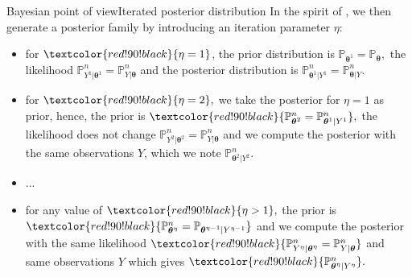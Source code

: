 \documentclass[10pt]{beamer}
\begin{document}
\begin{frame}{Bayesian point of view}{Iterated posterior distribution}
In the spirit of \citet{OBJJ}, we then generate a posterior family by introducing an \textcolor{red!90!black}{iteration parameter $\eta$}:
\begin{itemize}
\item<1-> for $\textcolor{red!90!black}{\eta = 1}$, the prior distribution is $\mathbb{P}_{\boldsymbol{\theta}^{1}} = \mathbb{P}_{\boldsymbol{\theta}},$ the likelihood $\mathbb{P}_{Y^{1} \vert \boldsymbol{\theta}^{1}}^{n} = \mathbb{P}_{Y \vert \boldsymbol{\theta}}^{n}$ and the posterior distribution is $\mathbb{P}_{\boldsymbol{\theta}^{1} \vert Y^{1}}^{n} = \mathbb{P}_{\boldsymbol{\theta}\vert Y}^{n}.$
\item<2-> for $\textcolor{red!90!black}{\eta = 2},$ we take the posterior for $\eta = 1$ as prior, hence, the \textcolor{red!90!black}{prior is} $\textcolor{red!90!black}{\mathbb{P}_{\boldsymbol{\theta}^{2}}^{n} = \mathbb{P}_{\boldsymbol{\theta}^{1} \vert Y^{1}}^{n}},$ the likelihood does not change $\mathbb{P}_{Y^{2} \vert \boldsymbol{\theta}^{2}}^{n} = \mathbb{P}_{Y \vert \boldsymbol{\theta}}^{n}$ and we compute the posterior with the same observations $Y$, which we note $\mathbb{P}_{\boldsymbol{\theta}^{2} \vert Y^{2}}^{n}.$
\item<3-> ...
\item<4-> for any value of $\textcolor{red!90!black}{\eta > 1},$ the prior is $\textcolor{red!90!black}{\mathbb{P}_{\boldsymbol{\theta}^{\eta}}^{n} = \mathbb{P}_{\boldsymbol{\theta}^{\eta-1} \vert Y^{\eta - 1}}}$ and we compute the posterior with the same likelihood $\textcolor{red!90!black}{\mathbb{P}_{Y^{\eta} \vert \boldsymbol{\theta}^{\eta}}^{n} = \mathbb{P}_{Y \vert \boldsymbol{\theta}}^{n}}$ and same observations $Y$ which gives $\textcolor{red!90!black}{\mathbb{P}_{\boldsymbol{\theta}^{\eta} \vert Y^{\eta}}^{n}}.$
\end{itemize}
\end{frame}
\end{document}
